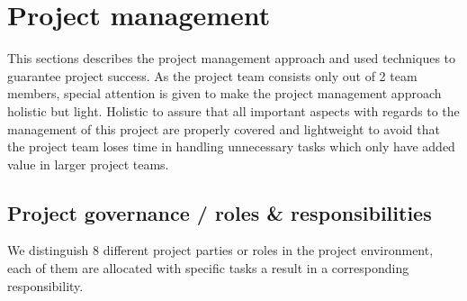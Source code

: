 \section{Project management}
\label{sec:project-management}
This sections describes the project management approach and used techniques to guarantee project success.
As the project team consists only out of 2 team members, special attention is given to make the project management approach holistic but light.
Holistic to assure that all important aspects with regards to the management of this project are properly covered and lightweight to avoid that the project team loses time in handling unnecessary tasks which only have added value in larger project teams.

\subsection{Project governance / roles \& responsibilities}
We distinguish 8 different project parties or roles in the project environment, each of them are allocated with specific tasks a result in a corresponding responsibility.
